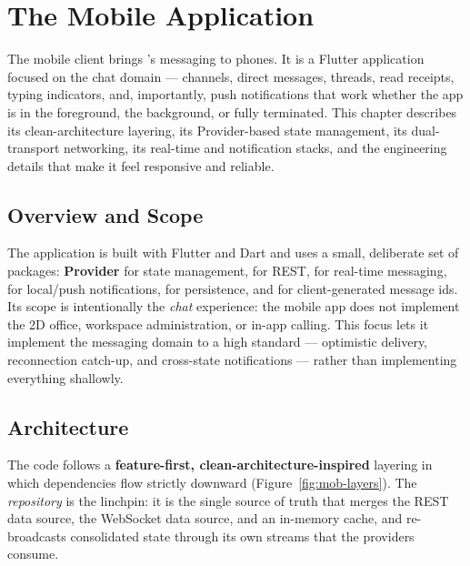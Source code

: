 \chapter{The Mobile Application}
\label{ch:mobile}

The mobile client brings \voname{}'s messaging to phones. It is a Flutter
application focused on the chat domain --- channels, direct messages, threads,
read receipts, typing indicators, and, importantly, push notifications that work
whether the app is in the foreground, the background, or fully terminated. This
chapter describes its clean-architecture layering, its Provider-based state
management, its dual-transport networking, its real-time and notification stacks,
and the engineering details that make it feel responsive and reliable.

\section{Overview and Scope}

The application is built with Flutter and Dart and uses a small, deliberate set of
packages: \textbf{Provider} for state management,  for REST,
\textbf{} for real-time messaging,
\textbf{} for local/push notifications,
 for persistence, and  for client-generated
message ids. Its scope is intentionally the \emph{chat} experience: the mobile app
does not implement the 2D office, workspace administration, or in-app calling.
This focus lets it implement the messaging domain to a high standard --- optimistic
delivery, reconnection catch-up, and cross-state notifications --- rather than
implementing everything shallowly.

\section{Architecture}

The code follows a \textbf{feature-first, clean-architecture-inspired} layering
in which dependencies flow strictly downward (Figure~\ref{fig:mob-layers}). The
\emph{repository} is the linchpin: it is the single source of truth that merges
the REST data source, the WebSocket data source, and an in-memory cache, and
re-broadcasts consolidated state through its own streams that the providers
consume.

